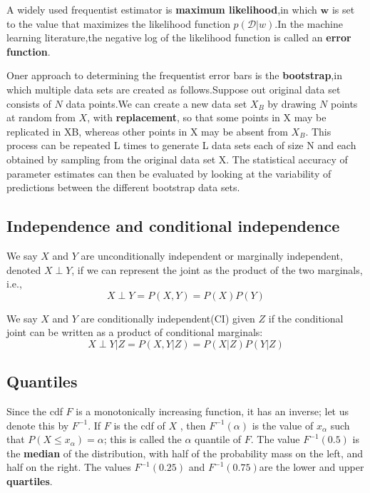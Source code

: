 A widely used frequentist estimator is \textbf{maximum likelihood},in which $\mathbf{w}$ is set to the value that maximizes the likelihood function $p(\mathcal{D}|w)$.In the machine learning literature,the negative log of the likelihood function is called an \textbf{error function}.

Oner approach to determining the frequentist error bars is the \textbf{bootstrap},in which multiple data sets are created as follows.Suppose out original data set consists of $N$ data points.We can create a new data set $X_B$ by drawing $N$ points at random from $X$, with \textbf{replacement}, so that some points in X may be replicated in XB, whereas other points in X may be absent from $X_B$. This process can be repeated L times to generate L data sets each of size N and each obtained by sampling from the original data set X. The statistical accuracy of parameter estimates can then be evaluated by looking at the variability of predictions between the different bootstrap data sets.



\subsection{Independence and conditional independence}
We say $X$ and $Y$ are unconditionally independent or marginally independent, denoted $X \perp Y$, if we can represent the joint as the product of the two marginals, i.e.,
\begin{equation}
X \perp Y=P(X,Y)=P(X)P(Y)
\end{equation}

We say $X$ and $Y$ are conditionally independent(CI) given $Z$ if the conditional joint can be written as a product of conditional marginals:
\begin{equation}
X \perp Y|Z=P(X,Y|Z)=P(X|Z)P(Y|Z)
\end{equation}

\subsection{Quantiles}
Since the cdf $F$ is a monotonically increasing function, it has an inverse; let us denote this by $F^{-1}$. If $F$ is the cdf of $X$ , then $F^{-1}(\alpha)$ is the value of $x_{\alpha}$ such that $P(X \leq x_{\alpha})=\alpha$; this is called the $\alpha$ quantile of $F$. The value $F^{-1}(0.5)$ is the \textbf{median} of the distribution, with half of the probability mass on the left, and half on the right. The values $F^{-1}(0.25)$ and $F^{−1}(0.75)$are the lower and upper \textbf{quartiles}.

